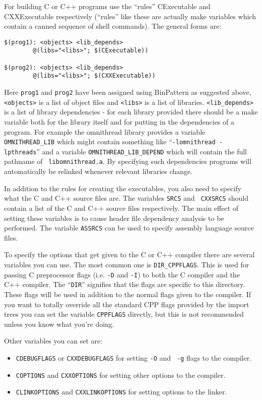 \documentclass[11pt,twoside,onecolumn]{article}
\begin{document}
For building C or C++ programs use the ``rules'' CExecutable and CXXExecutable
respectively (``rules'' like these are actually make variables which contain a
canned sequence of shell commands).  The general forms are:

{\footnotesize \begin{verbatim}
$(prog1): <objects> <lib_depends>
        @(libs="<libs>"; $(CExecutable))

$(prog2): <objects> <lib_depends>
        @(libs="<libs>"; $(CXXExecutable))
\end{verbatim}}

Here {\tt prog1} and {\tt prog2} have been assigned using BinPattern as
suggested above, {\tt <objects>} is a list of object files and {\tt <libs>} is
a list of libraries.  \verb|<lib_depends>| is a list of library dependencies -
for each library provided there should be a make variable both for the library
itself and for putting in the dependencies of a program.  For example the
omnithread library provides a variable \verb|OMNITHREAD_LIB| which might
contain something like ``{\tt -lomnithread -lpthreads}'' and a variable
\verb|OMNITHREAD_LIB_DEPEND| which will contain the full pathname of {\tt
libomnithread.a}.  By specifying such dependencies programs will automatically
be relinked whenever relevant libraries change.

In addition to the rules for creating the executables, you also need to specify
what the C and C++ source files are.  The variables {\tt SRCS} and {\tt
CXXSRCS} should contain a list of the C and C++ source files respectively.  The
main effect of setting these variables is to cause header file dependency
analysis to be performed.  The variable {\tt ASSRCS} can be used to specify
assembly language source files.

To specify the options that get given to the C or C++ compiler there are
several variables you can use.  The most common one is \verb|DIR_CPPFLAGS|.
This is used for passing C preprocessor flags (i.e. {\tt -D} and {\tt -I}) to
both the C compiler and the C++ compiler.  The ``{\tt DIR}'' signifies that the
flags are specific to this directory.  These flags will be used in addition to
the normal flags given to the compiler.  If you want to totally override all
the standard CPP flags provided by the import trees you can set the variable
{\tt CPPFLAGS} directly, but this is not recommended unless you know what
you're doing.

Other variables you can set are:

\begin{itemize}
\item {\tt CDEBUGFLAGS} or {\tt CXXDEBUGFLAGS} for setting {\tt -O} and {\tt
-g} flags to the compiler.
\item {\tt COPTIONS} and {\tt CXXOPTIONS} for setting other options to the
compiler.
\item {\tt CLINKOPTIONS} and {\tt CXXLINKOPTIONS} for setting options to the
linker.
\end{itemize}
\end{document}
